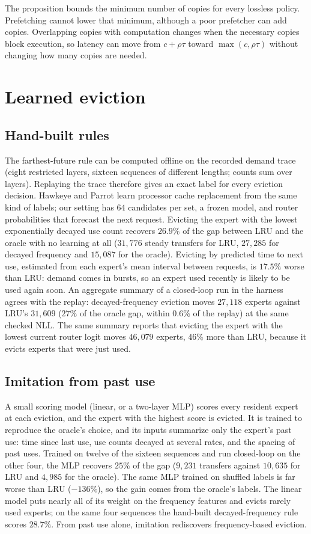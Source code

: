 \documentclass{article}
\newcommand{\xf}{\ensuremath{\rho}}
\begin{document}
The proposition bounds the minimum number of copies for every lossless
policy. Prefetching cannot lower that minimum, although a poor prefetcher can
add copies. Overlapping copies with computation changes when the necessary
copies block execution, so latency can move from $c + \xf\tau$ toward
$\max(c,\xf\tau)$ without changing how many copies are needed.

\section{Learned eviction}
\label{app:evict}

\subsection{Hand-built rules}
The farthest-future rule can be computed offline
on the recorded demand trace (eight restricted layers, sixteen sequences of
different lengths; counts sum over layers). Replaying the trace therefore
gives an exact label for every eviction decision. Hawkeye
\citep{jain2016hawkeye} and Parrot \citep{liu2020parrot} learn processor
cache replacement from the same kind of labels; our setting has $64$
candidates per set, a frozen model, and router probabilities that forecast
the next request. Evicting the expert with the lowest exponentially decayed
use count recovers $26.9\%$ of the gap between LRU and the oracle with no
learning at all ($31{,}776$ steady transfers for LRU, $27{,}285$ for decayed
frequency and $15{,}087$ for the oracle). Evicting by predicted time to next
use, estimated from each expert's mean interval between requests, is
$17.5\%$ worse than LRU: demand comes in bursts, so an expert used recently
is likely to be used again soon. An aggregate summary of a closed-loop run in
the harness agrees with the replay: decayed-frequency eviction moves
$27{,}118$ experts against LRU's $31{,}609$ ($27\%$ of the oracle gap,
within $0.6\%$ of the replay) at the same checked NLL. The same summary
reports that evicting the expert with the lowest current router logit moves
$46{,}079$ experts, $46\%$ more than LRU, because it evicts experts that were
just used.

\subsection{Imitation from past use}
A small scoring model (linear,
or a two-layer MLP) scores every resident expert at each eviction, and the
expert with the highest score is evicted. It is trained to reproduce the
oracle's choice, and its inputs summarize only the expert's past use: time
since last use, use counts decayed at several rates, and the spacing of past
uses. Trained on twelve of the sixteen sequences and run closed-loop on the
other four, the MLP recovers $25\%$ of the gap ($9{,}231$ transfers against
$10{,}635$ for LRU and $4{,}985$ for the oracle). The same MLP trained on
shuffled labels is far worse than LRU ($-136\%$), so the gain comes from the
oracle's labels. The linear model puts nearly all of its weight on the
frequency features and evicts rarely used experts; on the same four
sequences the hand-built decayed-frequency rule scores $28.7\%$. From past
use alone, imitation rediscovers frequency-based eviction.
\end{document}
